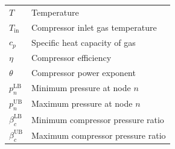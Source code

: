 \documentclass[11pt]{article}
\begin{document}
{\begin{table}[H]
\begin{tabular}{@{}ll@{}}
$T$ & Temperature \\
$T_{\mathrm{in}}$ & Compressor inlet gas temperature \\
$c_p$ & Specific heat capacity of gas \\
$\eta$ & Compressor efficiency \\
$\theta$ & Compressor power exponent \\
$p_n^{\mathrm{LB}}$ & Minimum pressure at node $n$ \\
$p_n^{\mathrm{UB}}$ & Maximum pressure at node $n$ \\
$\beta_c^{\mathrm{LB}}$ & Minimum compressor pressure ratio \\
$\beta_c^{\mathrm{UB}}$ & Maximum compressor pressure ratio \\
\bottomrule
\end{tabular}
\end{table}
}
\newpage

\end{document}
